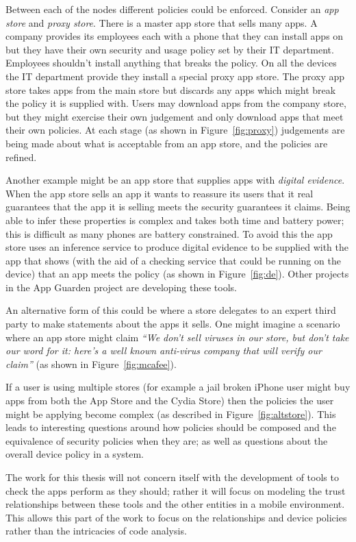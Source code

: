 \documentclass[a4paper,sfsidenotes]{tufte-book}
\begin{document}
Between each of the nodes different policies could be enforced.  Consider an
\emph{app store} and \emph{proxy store}.  There is a master app store that sells
many apps.  A company provides its employees each with a phone that they can
install apps on but they have their own security and usage policy set by their
IT department.  Employees shouldn't install anything that breaks the policy. On
all the devices the IT department provide they install a special proxy app
store.  The proxy app store takes apps from the main store but discards any apps
which might break the policy it is supplied with.  Users may download apps from
the company store, but they might exercise their own judgement and only download
apps that meet their own policies.  At each stage (as shown in
Figure~\ref{fig:proxy}) judgements are being made about what is acceptable from
an app store, and the policies are refined.

Another example might be an app store that supplies apps with \emph{digital
evidence}.  When the app store sells an app it wants to reassure its users that
it real guarantees that the app it is selling meets the security guarantees it
claims.  Being able to infer these properties is complex and takes both time and
battery power; this is difficult as many phones are battery constrained.  To
avoid this the app store uses an inference service to produce digital evidence
to be supplied with the app that shows (with the aid of a checking service that
could be running on the device) that an app meets the policy (as shown in
Figure~\ref{fig:de}). Other projects in the App Guarden project are 
developing these tools.

An alternative form of this could be where a store delegates to an expert third
party to make statements about the apps it sells.  One might imagine a scenario
where an app store might claim \emph{``We don't sell viruses in our store, but
don't take our word for it: here's a well known anti-virus company that will
verify our claim''} (as shown in Figure~\ref{fig:mcafee}).

If a user is using multiple stores (for example a jail broken iPhone user might
buy apps from both the App Store and the Cydia Store) then the policies the user
might be applying become complex (as described in Figure~\ref{fig:altstore}).
This leads to interesting questions around how policies should be composed and
the equivalence of security policies when they are; as well as questions about
the overall device policy in a system.

The work for this thesis will not concern itself with the development of tools
to check the apps perform as they should; rather it will focus on modeling the
trust relationships between these tools and the other entities in a mobile
environment.  This allows this part of the work to focus on the relationships
and device policies rather than the intricacies of code analysis.
\end{document}
